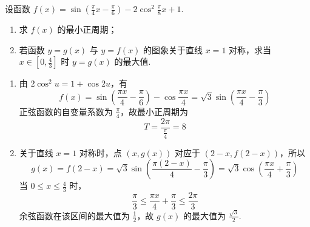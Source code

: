 \begin{problem}
设函数 \(f(x) = \sin \left(\frac{\pi}{4}x - \frac{\pi}{6}\right) - 2\cos^{2} \frac{\pi}{8}x + 1\).

\begin{enumerate}
\item 求 \(f(x)\) 的最小正周期；
\item 若函数 \(y = g(x)\) 与 \(y = f(x)\) 的图象关于直线 \(x = 1\) 对称，求当 \(x \in \left[0, \frac{4}{3}\right]\) 时 \(y = g(x)\) 的最大值.
\end{enumerate}

\begin{solution}
\begin{enumerate}
\item 由 \(2\cos^{2}u=1+\cos2u\)，有
\[
f(x)=\sin\left(\frac{\pi x}{4}-\frac{\pi}{6}\right)-\cos\frac{\pi x}{4}
=\sqrt{3}\sin\left(\frac{\pi x}{4}-\frac{\pi}{3}\right)
\]
正弦函数的自变量系数为 \(\frac{\pi}{4}\)，故最小正周期为
\[
T=\frac{2\pi}{\frac{\pi}{4}}=8
\]
\item 关于直线 \(x=1\) 对称时，点 \((x,g(x))\) 对应于 \((2-x,f(2-x))\)，所以
\[
g(x)=f(2-x)=\sqrt{3}\sin\left(\frac{\pi(2-x)}4-\frac\pi3\right)
=\sqrt{3}\cos\left(\frac{\pi x}{4}+\frac\pi3\right)
\]
当 \(0\leqslant x\leqslant\frac{4}{3}\) 时，
\[
\frac\pi3\leqslant\frac{\pi x}{4}+\frac\pi3\leqslant\frac{2\pi}3
\]
余弦函数在该区间的最大值为 \(\frac{1}{2}\)，故 \(g(x)\) 的最大值为 \(\frac{\sqrt3}{2}\).
\end{enumerate}
\end{solution}
\end{problem}

